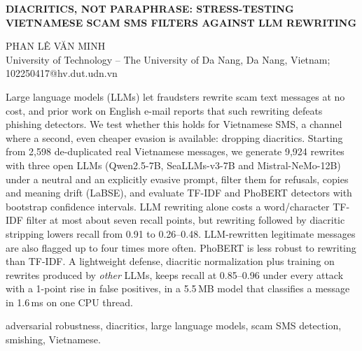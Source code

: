 \documentclass[11pt,a4paper]{article}
\begin{document}
\begin{center}
{\sffamily\fontsize{14}{17}\selectfont\bfseries DIACRITICS, NOT PARAPHRASE: STRESS-TESTING VIETNAMESE SCAM SMS FILTERS AGAINST LLM REWRITING\par}
\vspace{\baselineskip}
{\fontsize{11}{13}\selectfont
PHAN L\^E V\u{A}N MINH\\[0.5\baselineskip]
University of Technology -- The University of Da Nang, Da Nang, Vietnam;\\
102250417@hv.dut.udn.vn\par}
\end{center}
\vspace{\baselineskip}

 Large language models (LLMs) let fraudsters rewrite scam text messages at no cost, and prior work on English e-mail reports that such rewriting defeats phishing detectors. We test whether this holds for Vietnamese SMS, a channel where a second, even cheaper evasion is available: dropping diacritics. Starting from 2,598 de-duplicated real Vietnamese messages, we generate 9,924 rewrites with three open LLMs (Qwen2.5-7B, SeaLLMs-v3-7B and Mistral-NeMo-12B) under a neutral and an explicitly evasive prompt, filter them for refusals, copies and meaning drift (LaBSE), and evaluate TF-IDF and PhoBERT detectors with bootstrap confidence intervals. LLM rewriting alone costs a word/character TF-IDF filter at most about seven recall points, but rewriting followed by diacritic stripping lowers recall from 0.91 to 0.26--0.48. LLM-rewritten legitimate messages are also flagged up to four times more often. PhoBERT is less robust to rewriting than TF-IDF. A lightweight defense, diacritic normalization plus training on rewrites produced by \emph{other} LLMs, keeps recall at 0.85--0.96 under every attack with a 1-point rise in false positives, in a 5.5\,MB model that classifies a message in 1.6\,ms on one CPU thread.

\medskip
{} adversarial robustness, diacritics, large language models, scam SMS detection, smishing, Vietnamese.
\end{document}
